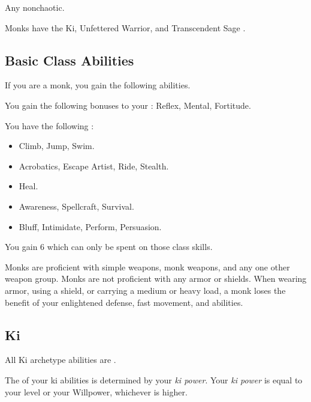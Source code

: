      Any nonchaotic.

     Monks have the Ki, Unfettered Warrior, and Transcendent Sage .

    \subsection{Basic Class Abilities}
        If you are a monk, you gain the following abilities.

        You gain the following bonuses to your :  Reflex,  Mental,  Fortitude.

        You have the following :
        \begin{itemize}
            \item {} Climb, Jump, Swim.
            \item {} Acrobatics, Escape Artist, Ride, Stealth.
            \item {} Heal.
            \item {} Awareness, Spellcraft, Survival.
            \item {} Bluff, Intimidate, Perform, Persuasion.
        \end{itemize}
        You gain 6  which can only be spent on those class skills.

        Monks are proficient with simple weapons, monk weapons, and any one other weapon group.
        Monks are not proficient with any armor or shields.
        When wearing armor, using a shield, or carrying a medium or heavy load, a monk loses the benefit of your enlightened defense, fast movement, and \ki abilities.

    \subsection{Ki}
        All Ki archetype abilities are .

        The  of your ki abilities is determined by your \textit{ki power}.
        Your \textit{ki power} is equal to your level or your Willpower, whichever is higher.

